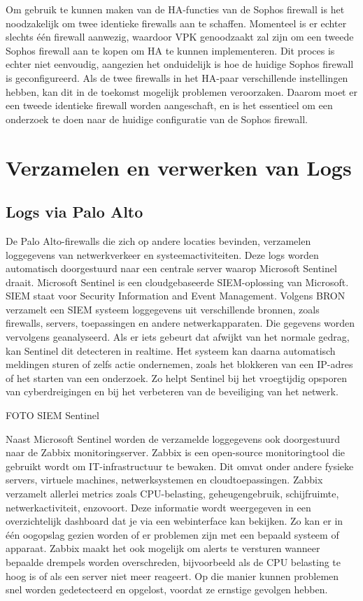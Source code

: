 Om gebruik te kunnen maken van de HA-functies van de Sophos firewall is het noodzakelijk om twee identieke firewalls aan te schaffen. Momenteel is er echter slechts één firewall aanwezig, waardoor VPK genoodzaakt zal zijn om een tweede Sophos firewall aan te kopen om HA te kunnen implementeren. Dit proces is echter niet eenvoudig, aangezien het onduidelijk is hoe de huidige Sophos firewall is geconfigureerd. Als de twee firewalls in het HA-paar verschillende instellingen hebben, kan dit in de toekomst mogelijk problemen veroorzaken. Daarom moet er een tweede identieke firewall worden aangeschaft, en is het essentieel om een onderzoek te doen naar de huidige configuratie van de Sophos firewall.



\section{Verzamelen en verwerken van Logs}

\subsection{Logs via Palo Alto}
De Palo Alto-firewalls die zich op andere locaties bevinden, verzamelen loggegevens van netwerkverkeer en systeemactiviteiten. Deze logs worden automatisch doorgestuurd naar een centrale server waarop Microsoft Sentinel draait. Microsoft Sentinel is een cloudgebaseerde SIEM-oplossing van Microsoft. SIEM staat voor Security Information and Event Management.
Volgens BRON verzamelt een SIEM systeem loggegevens uit verschillende bronnen, zoals firewalls, servers, toepassingen en andere netwerkapparaten. Die gegevens worden vervolgens geanalyseerd. Als er iets gebeurt dat afwijkt van het normale gedrag, kan Sentinel dit detecteren in realtime. Het systeem kan daarna automatisch meldingen sturen of zelfs actie ondernemen, zoals het blokkeren van een IP-adres of het starten van een onderzoek. Zo helpt Sentinel bij het vroegtijdig opsporen van cyberdreigingen en bij het verbeteren van de beveiliging van het netwerk.

FOTO SIEM Sentinel


Naast Microsoft Sentinel worden de verzamelde loggegevens ook doorgestuurd naar de Zabbix monitoringserver. Zabbix is een open-source monitoringtool die gebruikt wordt om IT-infrastructuur te bewaken. Dit omvat onder andere fysieke servers, virtuele machines, netwerksystemen en cloudtoepassingen.
Zabbix verzamelt allerlei metrics zoals CPU-belasting, geheugengebruik, schijfruimte, netwerkactiviteit, enzovoort. Deze informatie wordt weergegeven in een overzichtelijk dashboard dat je via een webinterface kan bekijken. Zo kan er in één oogopslag gezien worden of er problemen zijn met een bepaald systeem of apparaat.
Zabbix maakt het ook mogelijk om alerts te versturen wanneer bepaalde drempels worden overschreden, bijvoorbeeld als de CPU belasting te hoog is of als een server niet meer reageert. Op die manier kunnen problemen snel worden gedetecteerd en opgelost, voordat ze ernstige gevolgen hebben.

